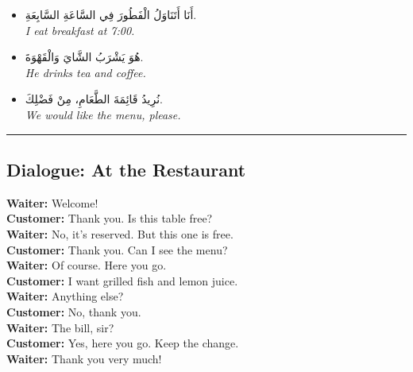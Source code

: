 \documentclass[
  a4paper,
  DIV=11,
  numbers=noendperiod]{scrartcl}
\begin{document}
\begin{itemize}
\item
  أَنَا أَتَنَاوَلُ الْفَطُورَ فِي السَّاعَةِ السَّابِعَةِ.\\
  \emph{I eat breakfast at 7:00.}
\item
  هُوَ يَشْرَبُ الشَّايَ وَالْقَهْوَةَ.\\
  \emph{He drinks tea and coffee.}
\item
  نُرِيدُ قَائِمَةَ الطَّعَامِ، مِنْ فَضْلِكَ.\\
  \emph{We would like the menu, please.}
\end{itemize}

\begin{center}\rule{0.5\linewidth}{0.5pt}\end{center}

\begin{tcolorbox}[enhanced jigsaw, bottomrule=.15mm, arc=.35mm, colbacktitle=quarto-callout-caution-color!10!white, opacityback=0, toptitle=1mm, title=\textcolor{quarto-callout-caution-color}{\faFire}\hspace{0.5em}{Click to Practice a Conversation}, colframe=quarto-callout-caution-color-frame, opacitybacktitle=0.6, colback=white, coltitle=black, titlerule=0mm, left=2mm, toprule=.15mm, bottomtitle=1mm, rightrule=.15mm, leftrule=.75mm, breakable]

\subsection{Dialogue: At the
Restaurant}\label{dialogue-at-the-restaurant}

\textbf{Waiter:} Welcome!\\
\textbf{Customer:} Thank you. Is this table free?\\
\textbf{Waiter:} No, it's reserved. But this one is free.\\
\textbf{Customer:} Thank you. Can I see the menu?\\
\textbf{Waiter:} Of course. Here you go.\\
\textbf{Customer:} I want grilled fish and lemon juice.\\
\textbf{Waiter:} Anything else?\\
\textbf{Customer:} No, thank you.\\
\textbf{Waiter:} The bill, sir?\\
\textbf{Customer:} Yes, here you go. Keep the change.\\
\textbf{Waiter:} Thank you very much!

\end{tcolorbox}
\end{document}
